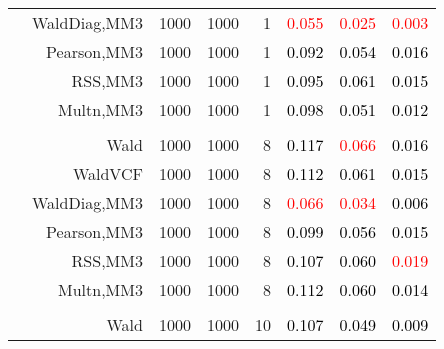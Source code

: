 \documentclass[
]{article}
\begin{document}
\begin{table}[H]
{\begin{tabular}[t]{lrrrrrrr}
\hspace{1em} & WaldDiag,MM3 & 1000 & 1000 & 1 & \textcolor{red}{0.055} & \textcolor{red}{0.025} & \textcolor{red}{0.003}\\

\hspace{1em} & Pearson,MM3 & 1000 & 1000 & 1 & \textcolor{black}{0.092} & \textcolor{black}{0.054} & \textcolor{black}{0.016}\\

\hspace{1em} & RSS,MM3 & 1000 & 1000 & 1 & \textcolor{black}{0.095} & \textcolor{black}{0.061} & \textcolor{black}{0.015}\\

\hspace{1em} & Multn,MM3 & 1000 & 1000 & 1 & \textcolor{black}{0.098} & \textcolor{black}{0.051} & \textcolor{black}{0.012}\\
\cmidrule{1-8}
\addlinespace[0.3em]
\multicolumn{8}{l}{\textbf{1F 15V}}\\
\hspace{1em} & Wald & 1000 & 1000 & 8 & \textcolor{black}{0.117} & \textcolor{red}{0.066} & \textcolor{black}{0.016}\\

\hspace{1em} & WaldVCF & 1000 & 1000 & 8 & \textcolor{black}{0.112} & \textcolor{black}{0.061} & \textcolor{black}{0.015}\\

\hspace{1em} & WaldDiag,MM3 & 1000 & 1000 & 8 & \textcolor{red}{0.066} & \textcolor{red}{0.034} & \textcolor{black}{0.006}\\

\hspace{1em} & Pearson,MM3 & 1000 & 1000 & 8 & \textcolor{black}{0.099} & \textcolor{black}{0.056} & \textcolor{black}{0.015}\\

\hspace{1em} & RSS,MM3 & 1000 & 1000 & 8 & \textcolor{black}{0.107} & \textcolor{black}{0.060} & \textcolor{red}{0.019}\\

\hspace{1em} & Multn,MM3 & 1000 & 1000 & 8 & \textcolor{black}{0.112} & \textcolor{black}{0.060} & \textcolor{black}{0.014}\\
\cmidrule{1-8}
\addlinespace[0.3em]
\multicolumn{8}{l}{\textbf{2F 10V}}\\
\hspace{1em} & Wald & 1000 & 1000 & 10 & \textcolor{black}{0.107} & \textcolor{black}{0.049} & \textcolor{black}{0.009}\\


\end{tabular}}
\end{table}
\end{document}
